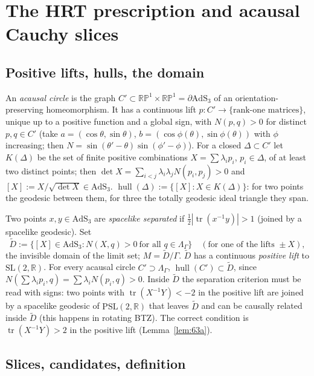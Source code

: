 \documentclass[aps,prd,onecolumn,superscriptaddress,nofootinbib,amsmath,amssymb,11pt]{revtex4-2}
\theoremstyle{definition}
\newcommand{\AdS}{\mathrm{AdS}_3}
\newcommand{\R}{\mathbb{R}}
\newcommand{\PSL}{\mathrm{PSL}(2,\R)}
\newcommand{\SL}{\mathrm{SL}(2,\R)}
\newcommand{\Dt}{\tilde D}
\newcommand{\hull}{\operatorname{hull}}
\newcommand{\tr}{\operatorname{tr}}
\begin{document}
\section{The HRT prescription and acausal Cauchy slices}\label{sec:hrtdef}

\subsection{Positive lifts, hulls, the domain}

An \emph{acausal circle} is the graph $C'\subset\mathbb{RP}^1\times\mathbb{RP}^1=\partial\AdS$ of an
orientation-preserving homeomorphism. It has a continuous lift $p:C'\to\{\text{rank-one matrices}\}$, unique up to a
positive function and a global sign, with $N(p,q)>0$ for distinct $p,q\in C'$ (take $a=(\cos\theta,\sin\theta)$,
$b=(\cos\phi(\theta),\sin\phi(\theta))$ with $\phi$ increasing; then $N=\sin(\theta'-\theta)\sin(\phi'-\phi)$). For a
closed $\Delta\subset C'$ let $K(\Delta)$ be the set of finite positive combinations $X=\sum\lambda_ip_i$, $p_i\in\Delta$,
of at least two distinct points; then $\det X=\sum_{i<j}\lambda_i\lambda_jN(p_i,p_j)>0$ and $[X]:=X/\sqrt{\det X}\in\AdS$.
$\hull(\Delta):=\{[X]:X\in K(\Delta)\}$: for two points the geodesic between them, for three the totally geodesic ideal
triangle they span.

Two points $x,y\in\AdS$ are \emph{spacelike separated} if $\frac12|\tr(x^{-1}y)|>1$ (joined by a spacelike geodesic).
Set
\[
\Dt:=\{[X]\in\AdS: N(X,q)>0\ \text{for all }q\in\Lambda_\Gamma\}\quad(\text{for one of the lifts }\pm X),
\]
the invisible domain of the limit set; $M=\Dt/\Gamma$. $\Dt$ has a continuous \emph{positive lift} to $\SL$. For every
acausal circle $C'\supset\Lambda_\Gamma$, $\hull(C')\subset\Dt$, since $N(\sum\lambda_ip_i,q)=\sum\lambda_iN(p_i,q)>0$.
Inside $\Dt$ the separation criterion must be read with signs: two points with $\tr(X^{-1}Y)<-2$ in the positive lift are
joined by a spacelike geodesic of $\PSL$ that leaves $\Dt$ and can be causally related inside $\Dt$ (this happens in
rotating BTZ). The correct condition is $\tr(X^{-1}Y)>2$ in the positive lift (Lemma~\ref{lem:63a}).

\subsection{Slices, candidates, definition}
\end{document}
